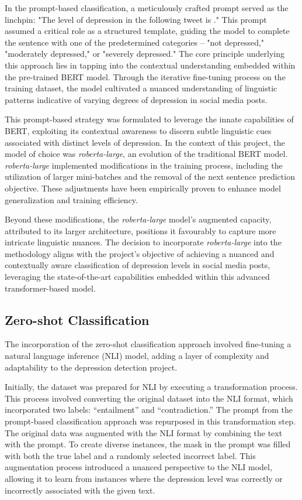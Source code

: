 \documentclass{article}
\begin{document}
In the prompt-based classification, a meticulously crafted prompt served as the linchpin: "The level of depression in the following tweet is {}." This prompt assumed a critical role as a structured template, guiding the model to complete the sentence with one of the predetermined categories – "not depressed," "moderately depressed," or "severely depressed." The core principle underlying this approach lies in tapping into the contextual understanding embedded within the pre-trained BERT model. Through the iterative fine-tuning process on the training dataset, the model cultivated a nuanced understanding of linguistic patterns indicative of varying degrees of depression in social media posts.

This prompt-based strategy was formulated to leverage the innate capabilities of BERT, exploiting its contextual awareness to discern subtle linguistic cues associated with distinct levels of depression. In the context of this project, the model of choice was \emph{roberta-large}, an evolution of the traditional BERT model. \emph{roberta-large} implemented modifications in the training process, including the utilization of larger mini-batches and the removal of the next sentence prediction objective. These adjustments have been empirically proven to enhance model generalization and training efficiency\citep{liu2019roberta}.

Beyond these modifications, the \emph{roberta-large} model's augmented capacity, attributed to its larger architecture, positions it favourably to capture more intricate linguistic nuances. The decision to incorporate \emph{roberta-large} into the methodology aligns with the project's objective of achieving a nuanced and contextually aware classification of depression levels in social media posts, leveraging the state-of-the-art capabilities embedded within this advanced transformer-based model.

\subsection{Zero-shot Classification}

The incorporation of the zero-shot classification approach involved fine-tuning a natural language inference (NLI) model, adding a layer of complexity and adaptability to the depression detection project. 

Initially, the dataset was prepared for NLI by executing a transformation process. This process involved converting the original dataset into the NLI format, which incorporated two labels: “entailment” and “contradiction.” The prompt from the prompt-based classification approach was repurposed in this transformation step. The original data was augmented with the NLI format by combining the text with the prompt. To create diverse instances, the mask in the prompt was filled with both the true label and a randomly selected incorrect label. This augmentation process introduced a nuanced perspective to the NLI model, allowing it to learn from instances where the depression level was correctly or incorrectly associated with the given text.
\end{document}
